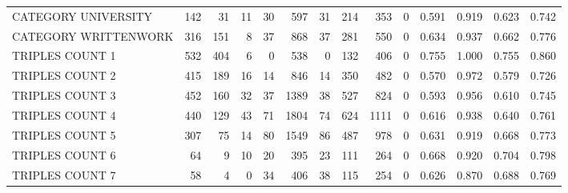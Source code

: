 \begin{tabular}{lrrrrrrrrrllll}
 CATEGORY UNIVERSITY      &             142 &            31 &              11 &              30 &             597 &   31 &  214 &  353 &    0 & 0.591 & 0.919 & 0.623 & 0.742 \\
 CATEGORY WRITTENWORK     &             316 &           151 &               8 &              37 &             868 &   37 &  281 &  550 &    0 & 0.634 & 0.937 & 0.662 & 0.776 \\
 TRIPLES COUNT 1          &             532 &           404 &               6 &               0 &             538 &    0 &  132 &  406 &    0 & 0.755 & 1.000 & 0.755 & 0.860 \\
 TRIPLES COUNT 2          &             415 &           189 &              16 &              14 &             846 &   14 &  350 &  482 &    0 & 0.570 & 0.972 & 0.579 & 0.726 \\
 TRIPLES COUNT 3          &             452 &           160 &              32 &              37 &            1389 &   38 &  527 &  824 &    0 & 0.593 & 0.956 & 0.610 & 0.745 \\
 TRIPLES COUNT 4          &             440 &           129 &              43 &              71 &            1804 &   74 &  624 & 1111 &    0 & 0.616 & 0.938 & 0.640 & 0.761 \\
 TRIPLES COUNT 5          &             307 &            75 &              14 &              80 &            1549 &   86 &  487 &  978 &    0 & 0.631 & 0.919 & 0.668 & 0.773 \\
 TRIPLES COUNT 6          &              64 &             9 &              10 &              20 &             395 &   23 &  111 &  264 &    0 & 0.668 & 0.920 & 0.704 & 0.798 \\
 TRIPLES COUNT 7          &              58 &             4 &               0 &              34 &             406 &   38 &  115 &  254 &    0 & 0.626 & 0.870 & 0.688 & 0.769 \\
\hline
\end{tabular}